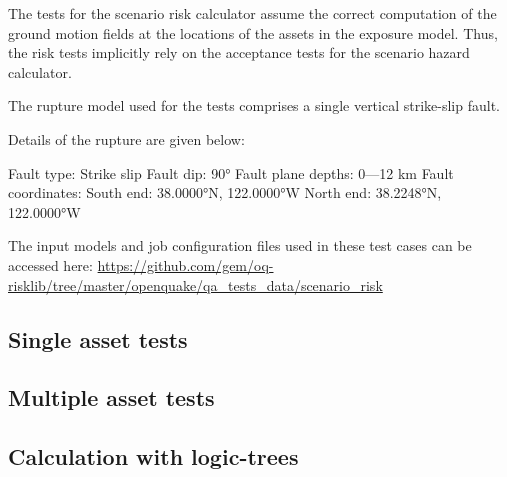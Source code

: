 The tests for the scenario risk calculator assume the correct computation of the ground motion fields at the locations of the assets in the exposure model. Thus, the risk tests implicitly rely on the acceptance tests for the scenario hazard calculator.

The rupture model used for the tests comprises a single vertical strike-slip fault.

Details of the rupture are given below:

Fault type: Strike slip
Fault dip: 90°
Fault plane depths: 0—12 km
Fault coordinates:
South end: 38.0000°N, 122.0000°W
North end: 38.2248°N, 122.0000°W

The input models and job configuration files used in these test cases can be accessed here:
\href{https://github.com/gem/oq-risklib/tree/master/openquake/qa_tests_data/scenario_risk}
{https://github.com/gem/oq-risklib/tree/master/openquake/qa_tests_data/scenario_risk}

\subsection{Single asset tests}
\label{subsec:acc-scenario-single}


\subsection{Multiple asset tests}
\label{subsec:acc-scenario-multiple}


\subsection{Calculation with logic-trees}
\label{subsec:acc-scenario-logictrees}


